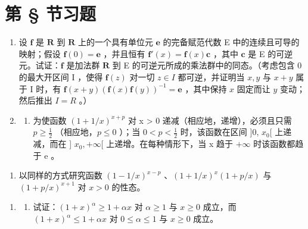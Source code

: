 \section*{第 \S{} 节习题}
{}

\begin{enumerate}
\def\labelenumi{\arabic{enumi})}
\item
  设 \(\mathbf{f}\) 是 \(\mathbf{R}\) 到 \(\mathbf{R}\) 上的一个具有单位元 \(\mathbf{e}\) 的完备赋范代数 E 中的连续且可导的映射；假设 \(\mathbf{f}(0) = \mathbf{e}\) ，并且恒有 \(\mathbf{f}'(x) = \mathbf{f}(x)\mathbf{c}\) ，其中 \(\mathbf{c}\) 是 E 的可逆元。试证：\(\mathbf{f}\) 是加法群 \(\mathbf{R}\) 到 E 的可逆元所成的乘法群中的同态。（考虑包含 0 的最大开区间 I ，使得 \(\mathbf{f}(z)\) 对一切 \(z \in I\) 都可逆，并证明当 \(x, y\) 与 \(x + y\) 属于 I 时，有 \(\mathbf{f}(x + y)(\mathbf{f}(x)\mathbf{f}(y))^{-1} = \mathbf{e}\) ，其中保持 \(x\) 固定而让 \(y\) 变动；然后推出 \(I = R\) 。）
\item
  \begin{enumerate}
  \def\labelenumii{\alph{enumii})}
  \tightlist
  \item
    为使函数 \((1 + 1/x)^{x+p}\) 对 x \textgreater{} 0 递减（相应地，递增），必须且只需 \(p \geqslant \frac{1}{2}\) （相应地，\(p \leqslant 0\) ）；当 \(0 < p < \frac{1}{2}\) 时，该函数在区间 {]}0, \(x_{0}[\) 上递减，而在 {]} \(x_{0}, +\infty[\) 上递增。在每种情形下，当 x 趋于 \(+\infty\) 时该函数都趋于 e 。
  \end{enumerate}
\end{enumerate}

\begin{enumerate}
\def\labelenumi{\alph{enumi})}
\setcounter{enumi}{1}
\tightlist
\item
  以同样的方式研究函数 \((1 - 1 / x)^{x - p}\) 、\((1 + 1 / x)^{x}(1 + p / x)\) 与 \((1 + p / x)^{x + 1}\) 对 \(x > 0\) 的性态。
\end{enumerate}

\begin{enumerate}
\def\labelenumi{\arabic{enumi})}
\setcounter{enumi}{2}
\tightlist
\item
  \begin{enumerate}
  \def\labelenumii{\alph{enumii})}
  \tightlist
  \item
    试证：\((1+x)^{\alpha} \geqslant 1 + \alpha x\) 对 \(\alpha \geqslant 1\) 与 \(x \geqslant 0\) 成立，而 \((1+x)^{\alpha} \leqslant 1 + \alpha x\) 对 \(0 \leqslant \alpha \leqslant 1\) 与 \(x \geqslant 0\) 成立。
  \end{enumerate}
\end{enumerate}

